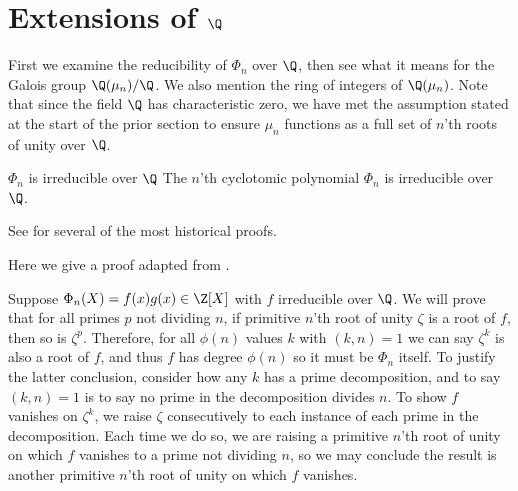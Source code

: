 \section[Extensions of Q]{Extensions of $\Q$}

First we examine the reducibility of $\Phi_n$ over $\Q$, then see what it means for the Galois group $\Q(\mu_n)/\Q$.
We also mention the ring of integers of $\Q(\mu_n)$.
Note that since the field $\Q$ has characteristic zero, we have met the assumption stated at the start of the prior section to ensure $\mu_n$ functions as a full set of $n$'th roots of unity over $\Q$.

\begin{theorem}{$\Phi_n$ is irreducible over $\Q$}
    The $n$'th cyclotomic polynomial $\Phi_n$ is irreducible over $\Q$.

    \proof
    See \cite{Weintraub} for several of the most historical proofs.

    \proof
    Here we give a proof adapted from \cite{Chen06}.

    Suppose $\Phi_n(X)=f(x)g(x)\in\Z[X]$ with $f$ irreducible over $\Q$.
    We will prove that for all primes $p$ not dividing $n$, if primitive $n$'th root of unity $\zeta$ is a root of $f$, then so is $\zeta^p$.
    Therefore, for all $\phi(n)$ values $k$ with $(k,n)=1$ we can say $\zeta^k$ is also a root of $f$, and thus $f$ has degree $\phi(n)$ so it must be $\Phi_n$ itself.
    To justify the latter conclusion, consider how any $k$ has a prime decomposition, and to say $(k,n)=1$ is to say no prime in the decomposition divides $n$.
    To show $f$ vanishes on $\zeta^k$, we raise $\zeta$ consecutively to each instance of each prime in the decomposition.
    Each time we do so, we are raising a primitive $n$'th root of unity on which $f$ vanishes to a prime not dividing $n$, so we may conclude the result is another primitive $n$'th root of unity on which $f$ vanishes.


\end{theorem}
